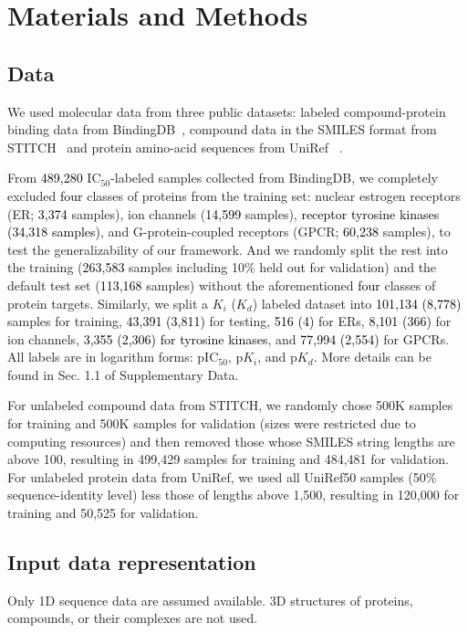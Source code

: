 \documentclass[nocrop]{bioinfo}
\newcommand{\red}[1]{\textcolor{black}{#1}}
\begin{document}
\vspace{-3em}

\section{Materials and Methods}
\subsection{Data}

We used molecular data from three public datasets: labeled compound-protein binding data from BindingDB~\citep{liu2006bindingdb}, compound data in the SMILES format from STITCH~\citep{kuhn2007stitch} and protein amino-acid sequences from UniRef ~\citep{suzek2014uniref}.

From \red{489,280} IC$_{50}$-labeled samples collected from BindingDB, we completely excluded \red{four} classes of proteins from the training set:  nuclear estrogen receptors  (ER;  \red{3,374} samples), ion channels  (\red{14,599} samples), \red{ receptor tyrosine kinases  (34,318 samples)}, and G-protein-coupled receptors  (GPCR; \red{60,238} samples), to test the generalizability of our framework.  And we randomly split the rest into the training  (\red{263,583} samples including 10\% held out for validation) and the default test set  (\red{113,168} samples) without the aforementioned \red{four} classes of protein targets.  Similarly, we split a $K_i$  ($K_d$) labeled dataset into \red{101,134  (8,778)} samples for training, \red{43,391  (3,811)} for testing, \red{516  (4)} for ERs, \red{8,101  (366)} for ion channels, \red{3,355  (2,306) for tyrosine kinases}, and \red{77,994  (2,554)} for GPCRs. All labels are in logarithm forms: pIC$_{50}$, p$K_i$, and p$K_d$.  More details can be found in Sec. 1.1 of Supplementary Data.  
 
For unlabeled compound data from STITCH, we randomly chose 500K samples for training and 500K samples for validation  (sizes were restricted due to computing resources) and then removed those whose SMILES string lengths are above 100, resulting in 499,429 samples for training and 484,481 for validation. For unlabeled protein data from UniRef, we used all UniRef50 samples  (50\% sequence-identity level) less those of  lengths above 1,500, resulting in  120,000 for training and 50,525 for validation.  


 \vspace{-1em}
\subsection{Input data representation}
Only 1D sequence data are assumed available. 3D structures of proteins, compounds, or their complexes are not used.  
\end{document}
